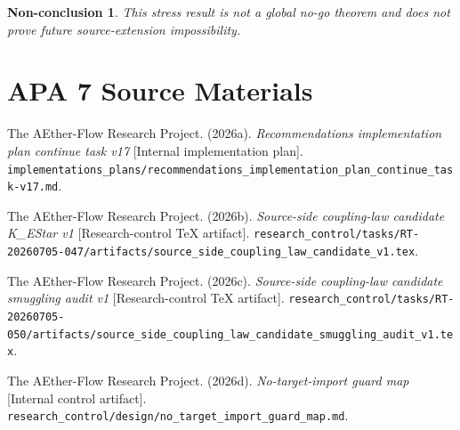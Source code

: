 \documentclass[11pt]{article}
\newtheorem{nonconclusion}{Non-conclusion}
\begin{document}
\begin{nonconclusion}
This stress result is not a global no-go theorem and does not prove future
source-extension impossibility.
\end{nonconclusion}

\section{APA 7 Source Materials}

The AEther-Flow Research Project. (2026a). \emph{Recommendations
implementation plan continue task v17} [Internal implementation plan].
\texttt{implementations\_plans/recommendations\_implementation\_plan\_continue\_task-v17.md}.

The AEther-Flow Research Project. (2026b). \emph{Source-side coupling-law
candidate K\_EStar v1} [Research-control TeX artifact].
\texttt{research\_control/tasks/RT-20260705-047/artifacts/source\_side\_coupling\_law\_candidate\_v1.tex}.

The AEther-Flow Research Project. (2026c). \emph{Source-side coupling-law
candidate smuggling audit v1} [Research-control TeX artifact].
\texttt{research\_control/tasks/RT-20260705-050/artifacts/source\_side\_coupling\_law\_candidate\_smuggling\_audit\_v1.tex}.

The AEther-Flow Research Project. (2026d). \emph{No-target-import guard map}
[Internal control artifact].
\texttt{research\_control/design/no\_target\_import\_guard\_map.md}.
\end{document}
